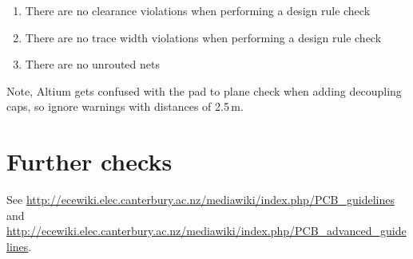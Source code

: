\documentclass[a4paper, 12pt]{article}
\begin{document}
\begin{enumerate}
\item There are no clearance violations when performing a design rule check

\item There are no trace width violations when performing a design rule check

\item There are no unrouted nets
\end{enumerate}

Note, Altium gets confused with the pad to plane check when adding
decoupling caps, so ignore warnings with distances of 2.5\,m.


\section*{Further checks}

See
\url{http://ecewiki.elec.canterbury.ac.nz/mediawiki/index.php/PCB_guidelines}
and
\url{http://ecewiki.elec.canterbury.ac.nz/mediawiki/index.php/PCB_advanced_guidelines}.
\end{document}
